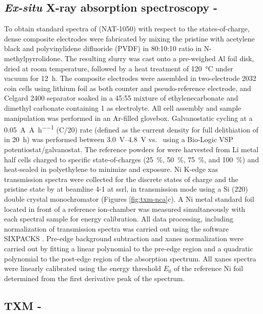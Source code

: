 \documentclass{article}
\begin{document}
\subsection*{\textit{Ex-situ} X-ray absorption spectroscopy - \nca{}}
To obtain standard spectra of \nca{} (NAT-1050) with respect to the
states-of-charge, dense composite electrodes were fabricated by mixing
the pristine \nca{} with acetylene black and polyvinylidene difluoride
(PVDF) in 80:10:10 ratio in N-methylpyrrolidone. The resulting slurry
was cast onto a pre-weighed Al foil disk, dried at room temperature,
followed by a heat treatment of \SI{120}{\celsius} under vacuum for
\SI{12}{\hour}. The composite electrodes were assembled in
two-electrode 2032 coin cells using lithium foil as both counter and
pseudo-reference electrode, and Celgard 2400 separator soaked in a
45:55 mixture of ethylenecarbonate and dimethyl carbonate containing
\SI{1}{\molar}  as electrolyte. All cell assembly and sample
manipulation was performed in an Ar-filled glovebox. Galvanostatic
cycling at a \SI{0.05}{\ampere\per\ampere\per\hour} (C/20) rate
(defined as the current density for full delithiation of \nca{} in
\SI{20}{\hour}) was performed between \SIrange{3.0}{4.8}{\volt}
vs.\  using a Bio-Logic VSP potentiostat/galvanostat. The
reference powders for \nca{} were harvested from Li metal half cells
charged to specific state-of-charges (\SI{25}{\percent},
\SI{50}{\percent}, \SI{75}{\percent}, and \SI{100}{\percent}) and
heat-sealed in polyethylene to minimize  and 
exposure. Ni K-edge \gls{xas} transmission spectra were collected for
the discrete states of charge and the pristine state by at beamline
4-1 at \gls{ssrl}, in transmission mode using a Si (220) double
crystal monochromator (Figures \ref{fig:txm-nca}c). A Ni metal
standard foil located in front of a reference ion-chamber was measured
simultaneously with each spectral sample for energy calibration. All
data processing, including normalization of transmission spectra was
carried out using the software {SIXPACKS} \cite{lai2011}. Pre-edge
background subtraction and \gls{xanes} normalization were carried out
by fitting a linear polynomial to the pre-edge region and a quadratic
polynomial to the post-edge region of the absorption spectrum. All
\gls{xanes} spectra were linearly calibrated using the energy
threshold $E_0$ of the reference Ni foil determined from the first
derivative peak of the spectrum.


\subsection*{TXM - \nca{}}
\end{document}
